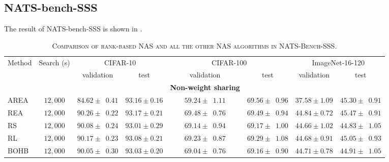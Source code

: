\documentclass[sigconf]{acmart}
\begin{document}
    \subsection{NATS-bench-SSS}
    The result of NATS-bench-SSS is shown in .
    \begin{table*}[htb]
        \newcommand{\z}{\phantom{0}}
        \caption{\textsc{Comparison of rank-based NAS and all the other NAS algorithms in NATS-Bench-SSS.}}
          \vspace{-\baselineskip}
        \begin{tabular}{@{}lccccccc@{}}\toprule
        Method & Search (s) & \multicolumn{2}{c}{CIFAR-10} & \multicolumn{2}{c}{CIFAR-100} & \multicolumn{2}{c}{ImageNet-16-120} \\ \cmidrule(lr){3-4}\cmidrule(lr){5-6}\cmidrule(lr){7-8}
        & & validation & test & validation & test & validation & test \\ \midrule
        &&&&\textbf{Non-weight sharing}&&&\\
        AREA      & $12,000$ & $84.62 \pm \z{0.41}$                & $93.16 \pm 0.16$               & $59.24 \pm \z{1.11}$                 & $69.56 \pm \z{0.96}$                & $37.58 \pm 1.09$                 & $45.30 \pm \z{0.91}$                \\
        REA       & $12,000$ & $90.26 \pm \z{0.22}$                & $93.17 \pm 0.21$               & $69.48 \pm \z{0.76}$                 & $69.49 \pm \z{0.94}$                & $44.84 \pm 0.72$                 & $45.47 \pm \z{0.91}$                \\
        RS        & $12,000$ & $90.08 \pm \z{0.24}$                & $93.01 \pm 0.29$               & $69.14 \pm \z{0.94}$                 & $69.17 \pm \z{1.00}$                & $44.66 \pm 1.02$                 & $44.83 \pm \z{1.05}$                \\
        RL        & $12,000$ & $90.17 \pm \z{0.23}$                & $93.08 \pm 0.21$               & $69.23 \pm \z{0.87}$                 & $69.29 \pm \z{1.08}$                & $44.68 \pm 0.91$                 & $45.05 \pm \z{0.93}$                \\
        BOHB      & $12,000$ & $90.05 \pm \z{0.30}$                & $93.03 \pm 0.20$               & $69.04 \pm \z{0.76}$                 & $69.16 \pm \z{0.90}$                & $44.71 \pm 0.78$                 & $44.91 \pm \z{1.05}$                \\ \midrule

\end{tabular}
\end{table*}
\end{document}
